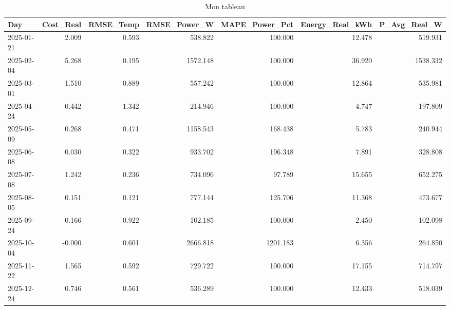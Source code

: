 \begin{table}
\caption{Mon tableau}
\label{tab:mon_tableau}
\begin{tabular}{lrrrrrr}
\toprule
Day & Cost_Real & RMSE_Temp & RMSE_Power_W & MAPE_Power_Pct & Energy_Real_kWh & P_Avg_Real_W \\
\midrule
2025-01-21 & 2.009 & 0.593 & 538.822 & 100.000 & 12.478 & 519.931 \\
2025-02-04 & 5.268 & 0.195 & 1572.148 & 100.000 & 36.920 & 1538.332 \\
2025-03-01 & 1.510 & 0.889 & 557.242 & 100.000 & 12.864 & 535.981 \\
2025-04-24 & 0.442 & 1.342 & 214.946 & 100.000 & 4.747 & 197.809 \\
2025-05-09 & 0.268 & 0.471 & 1158.543 & 168.438 & 5.783 & 240.944 \\
2025-06-08 & 0.030 & 0.322 & 933.702 & 196.348 & 7.891 & 328.808 \\
2025-07-08 & 1.242 & 0.236 & 734.096 & 97.789 & 15.655 & 652.275 \\
2025-08-05 & 0.151 & 0.121 & 777.144 & 125.706 & 11.368 & 473.677 \\
2025-09-24 & 0.166 & 0.922 & 102.185 & 100.000 & 2.450 & 102.098 \\
2025-10-04 & -0.000 & 0.601 & 2666.818 & 1201.183 & 6.356 & 264.850 \\
2025-11-22 & 1.565 & 0.592 & 729.722 & 100.000 & 17.155 & 714.797 \\
2025-12-24 & 0.746 & 0.561 & 536.289 & 100.000 & 12.433 & 518.039 \\
\bottomrule
\end{tabular}
\end{table}
